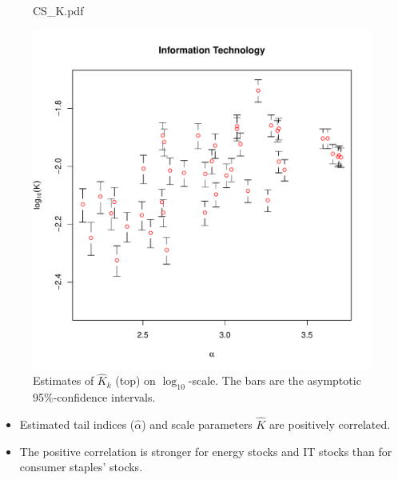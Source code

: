 \documentclass{beamer}
\begin{document}
\begin{frame}
\begin{figure}[htb!]
\begin{minipage}{0.33\linewidth}
                      {CS_K.pdf}
    \end{minipage}\hfill
    \begin{minipage}{0.33\linewidth}
      \includegraphics[width=\textwidth]
                      {IT_K.pdf}
    \end{minipage}
    \caption{\scriptsize Estimates of $\hat K_k$ (top) on
      $\log_{10}$-scale. The bars are the asymptotic 95\%-confidence
      intervals.
    }
    \label{fig:sectors_parameters}
  \end{figure}
    \begin{itemize}
    \item Estimated tail indices ($\hat \alpha$) and scale parameters
      $\hat K$ are positively correlated.
    \item The positive correlation is stronger for energy stocks and
      IT stocks than for consumer staples' stocks.
  \end{itemize}
\end{frame}
\end{document}
